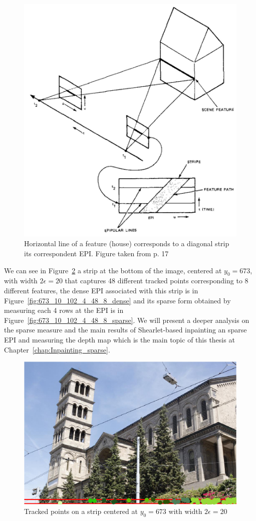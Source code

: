 \begin{figure}[h!]
\centering
\includegraphics[width = 0.6 \textwidth]{./Diagrams/Feature_EPI_bolles.jpg}
\caption{Horizontal line of a feature (house) corresponds to a diagonal strip its correspondent EPI\@. Figure taken from \cite{Bolles} p. 17}
\label{Feature_EPI_bolles}
\end{figure}

We can see in Figure~\ref{fig:673_10_102_4_48_8_strip} a strip at the bottom of the image, centered at $y_0=673$, with width $2\epsilon=20$ that captures 48 different tracked points corresponding to 8 different features, the dense EPI associated with this strip is in Figure~\ref{fig:673_10_102_4_48_8_dense} and its sparse form obtained by measuring each 4 rows at the EPI is in Figure~\ref{fig:673_10_102_4_48_8_sparse}. We will present a deeper analysis on the sparse measure and the main results of Shearlet-based inpainting an sparse EPI and measuring the depth map which is the main topic of this thesis at Chapter~\ref{chap:Inpainting_sparse}.

\begin{figure}[h!]
\centering
\includegraphics[width = 0.6 \textwidth]{./EPIs_Strips/EPIs/673_10_102_4_48_8_strip.png}
\caption{Tracked points on a strip centered at $y_0=673$ with width $2\epsilon=20$}
\label{fig:673_10_102_4_48_8_strip}
\end{figure}

